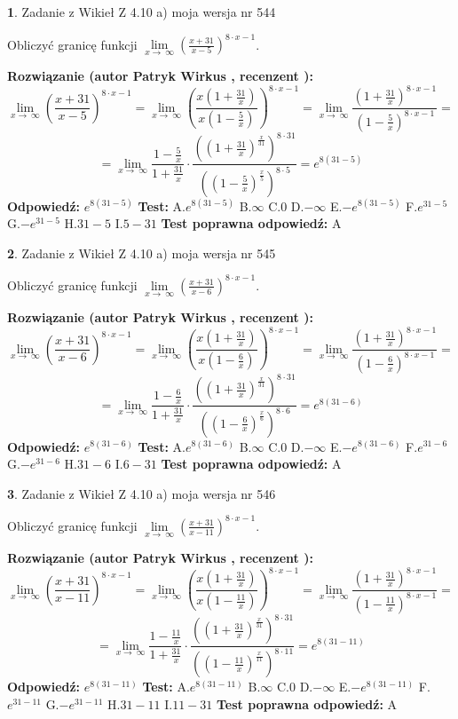\documentclass[12pt, a4paper]{article}
\theoremstyle{definition} %
\newtheorem{zad}{}
\newcommand{\zadStart}[1]{\begin{zad}#1\newline}
\newcommand{\zadStop}{\end{zad}}
\newcommand{\rozwStart}[2]{\noindent \textbf{Rozwiązanie (autor #1 , recenzent #2): }\newline}
\newcommand{\rozwStop}{\newline}
\newcommand{\odpStart}{\noindent \textbf{Odpowiedź:}\newline}
\newcommand{\odpStop}{\newline}
\newcommand{\testStart}{\noindent \textbf{Test:}\newline}
\newcommand{\testStop}{\newline}
\newcommand{\kluczStart}{\noindent \textbf{Test poprawna odpowiedź:}\newline}
\newcommand{\kluczStop}{\newline}
\begin{document}
\zadStart{Zadanie z Wikieł Z 4.10 a) moja wersja nr 544}


Obliczyć granicę funkcji  $\lim\limits_{x\to\ \infty}(\frac{x+31}{x-5})^{8\cdot x-1}$.
\zadStop
\rozwStart{Patryk Wirkus}{}
$$\lim\limits_{x\to\ \infty}(\frac{x+31}{x-5})^{8\cdot x-1} = \lim\limits_{x\to\ \infty}(\frac{x(1+\frac{31}{x})}{x(1-\frac{5}{x})})^{8\cdot x-1}=\lim\limits_{x\to\ \infty}\frac{(1+\frac{31}{x})^{8\cdot x-1}}{(1-\frac{5}{x})^{8\cdot x-1}}=$$
$$=\lim\limits_{x\to\ \infty}\frac{1-\frac{5}{x}}{1+\frac{31}{x}}\cdot\frac{((1+\frac{31}{x})^{\frac{x}{31}})^{8\cdot31}}{((1-\frac{5}{x})^{\frac{x}{5}})^{8\cdot5}}=e^{8(31-5)}$$
\rozwStop
\odpStart
$e^{8(31-5)}$
\odpStop
\testStart
A.$e^{8(31-5)}$ B.$\infty$ C.$0$ D.$-\infty$ E.$-e^{8(31-5)}$
F.$e^{31-5}$ G.$-e^{31-5}$
H.$31-5$
I.$5-31$
\testStop
\kluczStart
A
\kluczStop



\zadStart{Zadanie z Wikieł Z 4.10 a) moja wersja nr 545}


Obliczyć granicę funkcji  $\lim\limits_{x\to\ \infty}(\frac{x+31}{x-6})^{8\cdot x-1}$.
\zadStop
\rozwStart{Patryk Wirkus}{}
$$\lim\limits_{x\to\ \infty}(\frac{x+31}{x-6})^{8\cdot x-1} = \lim\limits_{x\to\ \infty}(\frac{x(1+\frac{31}{x})}{x(1-\frac{6}{x})})^{8\cdot x-1}=\lim\limits_{x\to\ \infty}\frac{(1+\frac{31}{x})^{8\cdot x-1}}{(1-\frac{6}{x})^{8\cdot x-1}}=$$
$$=\lim\limits_{x\to\ \infty}\frac{1-\frac{6}{x}}{1+\frac{31}{x}}\cdot\frac{((1+\frac{31}{x})^{\frac{x}{31}})^{8\cdot31}}{((1-\frac{6}{x})^{\frac{x}{6}})^{8\cdot6}}=e^{8(31-6)}$$
\rozwStop
\odpStart
$e^{8(31-6)}$
\odpStop
\testStart
A.$e^{8(31-6)}$ B.$\infty$ C.$0$ D.$-\infty$ E.$-e^{8(31-6)}$
F.$e^{31-6}$ G.$-e^{31-6}$
H.$31-6$
I.$6-31$
\testStop
\kluczStart
A
\kluczStop



\zadStart{Zadanie z Wikieł Z 4.10 a) moja wersja nr 546}


Obliczyć granicę funkcji  $\lim\limits_{x\to\ \infty}(\frac{x+31}{x-11})^{8\cdot x-1}$.
\zadStop
\rozwStart{Patryk Wirkus}{}
$$\lim\limits_{x\to\ \infty}(\frac{x+31}{x-11})^{8\cdot x-1} = \lim\limits_{x\to\ \infty}(\frac{x(1+\frac{31}{x})}{x(1-\frac{11}{x})})^{8\cdot x-1}=\lim\limits_{x\to\ \infty}\frac{(1+\frac{31}{x})^{8\cdot x-1}}{(1-\frac{11}{x})^{8\cdot x-1}}=$$
$$=\lim\limits_{x\to\ \infty}\frac{1-\frac{11}{x}}{1+\frac{31}{x}}\cdot\frac{((1+\frac{31}{x})^{\frac{x}{31}})^{8\cdot31}}{((1-\frac{11}{x})^{\frac{x}{11}})^{8\cdot11}}=e^{8(31-11)}$$
\rozwStop
\odpStart
$e^{8(31-11)}$
\odpStop
\testStart
A.$e^{8(31-11)}$ B.$\infty$ C.$0$ D.$-\infty$ E.$-e^{8(31-11)}$
F.$e^{31-11}$ G.$-e^{31-11}$
H.$31-11$
I.$11-31$
\testStop
\kluczStart
A
\kluczStop
\end{document}
